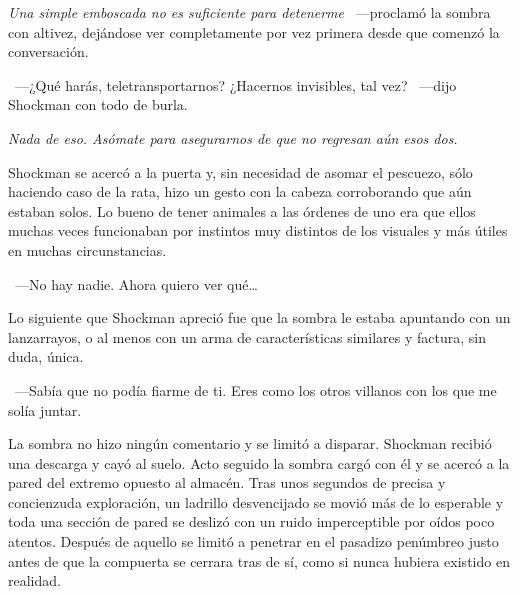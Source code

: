 \emph{Una simple emboscada no es suficiente para detenerme} ~---proclamó la sombra con altivez, dejándose ver completamente por vez primera desde que comenzó la conversación.

~---¿Qué harás, teletransportarnos? ¿Hacernos invisibles, tal vez? ~---dijo Shockman con todo de burla.

\emph{Nada de eso. Asómate para asegurarnos de que no regresan aún esos dos.}

Shockman se acercó a la puerta y, sin necesidad de asomar el pescuezo, sólo haciendo caso de la rata, hizo un gesto con la cabeza corroborando que aún estaban solos. Lo bueno de tener animales a las órdenes de uno era que ellos muchas veces funcionaban por instintos muy distintos de los visuales y más útiles en muchas circunstancias.

~---No hay nadie. Ahora quiero ver qué\dots

Lo siguiente que Shockman apreció fue que la sombra le estaba apuntando con un lanzarrayos, o al menos con un arma de características similares y factura, sin duda, única.

~---Sabía que no podía fiarme de ti. Eres como los otros villanos con los que me solía juntar.

La sombra no hizo ningún comentario y se limitó a disparar. Shockman recibió una descarga y cayó al suelo. Acto seguido la sombra cargó con él y se acercó a la pared del extremo opuesto al almacén. Tras unos segundos de precisa y concienzuda exploración, un ladrillo desvencijado se movió más de lo esperable y toda una sección de pared se deslizó con un ruido imperceptible por oídos poco atentos. Después de aquello se limitó a penetrar en el pasadizo penúmbreo justo antes de que la compuerta se cerrara tras de sí, como si nunca hubiera existido en realidad.

\endinput
